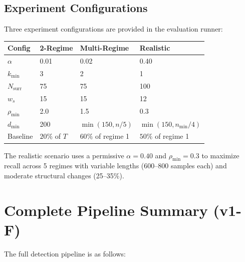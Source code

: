 \documentclass{article}
\begin{document}
\subsection{Experiment Configurations}
Three experiment configurations are provided in the evaluation runner:

\begin{center}
\begin{tabular}{llll}
\toprule
\textbf{Config} & \textbf{2-Regime} & \textbf{Multi-Regime} & \textbf{Realistic} \\
\midrule
$\alpha$ & 0.01 & 0.02 & 0.40 \\
$k_{\min}$ & 3 & 2 & 1 \\
$N_{\mathrm{surr}}$ & 75 & 75 & 100 \\
$w_s$ & 15 & 15 & 12 \\
$\rho_{\min}$ & 2.0 & 1.5 & 0.3 \\
$d_{\min}$ & 200 & $\min(150, n/5)$ & $\min(150, n_{\min}/4)$ \\
Baseline & $20\%$ of $T$ & $60\%$ of regime 1 & $50\%$ of regime 1 \\
\bottomrule
\end{tabular}
\end{center}

The realistic scenario uses a permissive $\alpha = 0.40$ and $\rho_{\min} = 0.3$ to maximize
recall across 5 regimes with variable lengths (600--800 samples each) and moderate structural
changes (25--35\%).

\section{Complete Pipeline Summary (v1-F)}

The full detection pipeline is as follows:
\end{document}
